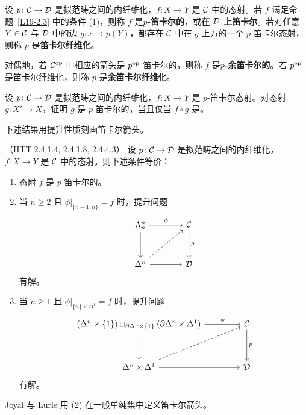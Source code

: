 \begin{definition}\label{L19-2.5}
设 $p\colon\mathcal{C}\to\mathcal{D}$ 是拟范畴之间的内纤维化，$f\colon X\to Y$ 是 $\mathcal{C}$ 中的态射。若 $f$ 满足命题~\ref{L19-2.3} 中的条件 (1)，则称 $f$ 是\textbf{$p$-笛卡尔的}，或\textbf{在 $\mathcal{D}$ 上笛卡尔}。若对任意 $Y\in\mathcal{C}$ 与 $\mathcal{D}$ 中的边 $g\colon x\to p(Y)$，都存在 $\mathcal{C}$ 中在 $g$ 上方的一个 $p$-笛卡尔态射，则称 $p$ 是\textbf{笛卡尔纤维化}。

对偶地，若 $\mathcal{C}^{\mathrm{op}}$ 中相应的箭头是 $p^{\mathrm{op}}$-笛卡尔的，则称 $f$ 是\textbf{$p$-余笛卡尔的}。若 $p^{\mathrm{op}}$ 是笛卡尔纤维化，则称 $p$ 是\textbf{余笛卡尔纤维化}。
\end{definition}

\begin{exercise}\label{L19-2.6}
设 $p\colon\mathcal{C}\to\mathcal{D}$ 是拟范畴之间的内纤维化，$f\colon X\to Y$ 是 $p$-笛卡尔态射。对态射 $g\colon X'\to X$，证明 $g$ 是 $p$-笛卡尔的，当且仅当 $f\circ g$ 是。
\end{exercise}

\nitem\label{L19-2.7} 下述结果用提升性质刻画笛卡尔箭头。

\begin{proposition}\label{L19-2.8}（HTT.2.4.1.4, 2.4.1.8, 2.4.4.3）
设 $p\colon\mathcal{C}\to\mathcal{D}$ 是拟范畴之间的内纤维化，$f\colon X\to Y$ 是 $\mathcal{C}$ 中的态射。则下述条件等价：
\begin{enumerate}[label=(\arabic*),leftmargin=2.4em,itemsep=0.1em]
\item 态射 $f$ 是 $p$-笛卡尔的。
\item 当 $n\ge 2$ 且 $\phi|_{\{n-1,n\}}=f$ 时，提升问题
\[
\begin{tikzcd}[column sep=3.8em,row sep=3em]
\Lambda^n_n \arrow[r,"\phi"] \arrow[d] & \cC \arrow[d,"p"]\\
\Delta^n \arrow[r] \arrow[ur,dashed] & \cD
\end{tikzcd}
\]
有解。
\item 当 $n\ge 1$ 且 $\phi|_{\{n\}\times\Delta^1}=f$ 时，提升问题
\[
\begin{tikzcd}[column sep=4.2em,row sep=3.2em]
(\Delta^n\times\{1\})\sqcup_{\partial\Delta^n\times\{1\}}(\partial\Delta^n\times\Delta^1)
 \arrow[r,"\phi"] \arrow[d] & \cC \arrow[d,"p"]\\
\Delta^n\times\Delta^1 \arrow[r] \arrow[ur,dashed] & \cD
\end{tikzcd}
\]
有解。
\end{enumerate}
\end{proposition}

\begin{remark}\label{L19-2.9}
Joyal 与 Lurie 用 (2) 在一般单纯集中定义笛卡尔箭头。
\end{remark}

